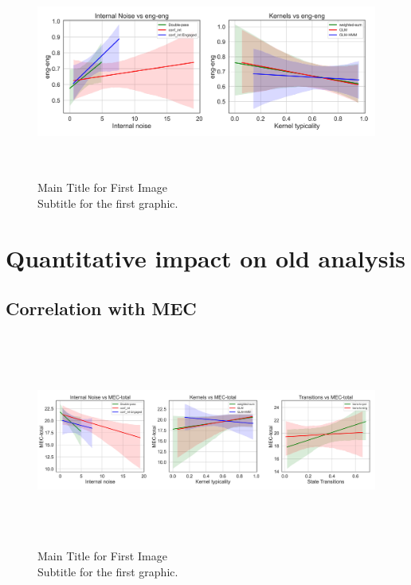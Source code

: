 \begin{figure}[H]
    \centering
    \includegraphics[width=17cm,height=7cm]{MainLayout/Images/chapter8/regression_results_eng_eng.jpg}
    \caption{Main Title for First Image \\ \small Subtitle for the first graphic.}
    \label{fig:regression_results_eng_eng}
\end{figure}

\section{Quantitative impact on old analysis}

\subsection {Correlation with MEC} 
\begin{figure}[H]
    \centering
    \includegraphics[width=17cm,height=7cm]{MainLayout/Images/chapter8/regression_results_mec.jpg}
    \caption{Main Title for First Image \\ \small Subtitle for the first graphic.}
    \label{fig:regression_results_mec}
\end{figure}

